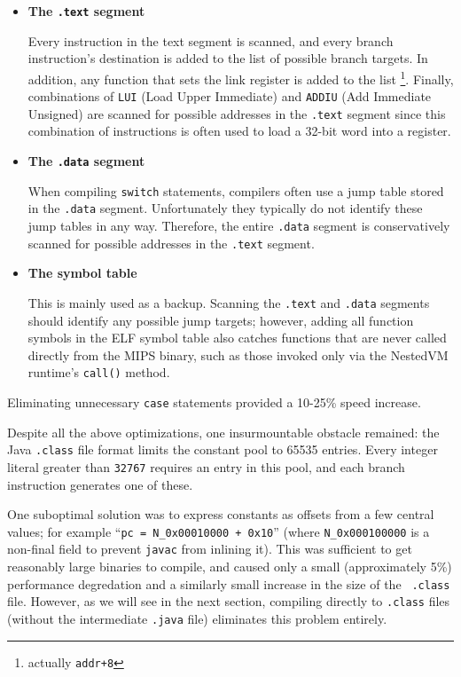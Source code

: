 \documentclass{acmconf}
\begin{document}
\begin{itemize}

\item {\bf The {\tt .text} segment}

      Every instruction in the text segment is scanned, and every
      branch instruction's destination is added to the list of
      possible branch targets.  In addition, any function that sets
      the link register is added to the list \footnote{actually {\tt addr+8}}.
      Finally, combinations of {\tt LUI} (Load Upper Immediate) and
      {\tt ADDIU} (Add Immediate Unsigned) are scanned for possible
      addresses in the {\tt .text} segment since this combination of
      instructions is often used to load a 32-bit word into a
      register.

\item {\bf The {\tt .data} segment}

      When compiling {\tt switch} statements, compilers often use a
      jump table stored in the {\tt .data} segment.  Unfortunately
      they typically do not identify these jump tables in any way.
      Therefore, the entire {\tt .data} segment is conservatively
      scanned for possible addresses in the {\tt .text} segment.
      
\item {\bf The symbol table}

      This is mainly used as a backup.  Scanning the {\tt .text} and
      {\tt .data} segments should identify any possible jump targets;
      however, adding all function symbols in the ELF symbol table
      also catches functions that are never called directly from the
      MIPS binary, such as those invoked only via the NestedVM
      runtime's {\tt call()} method.

\end{itemize}

Eliminating unnecessary {\tt case} statements provided a 10-25\% speed
increase.

Despite all the above optimizations, one insurmountable obstacle
remained: the Java {\tt .class} file format limits the constant pool
to 65535 entries.  Every integer literal greater than {\tt 32767}
requires an entry in this pool, and each branch instruction generates
one of these.

One suboptimal solution was to express constants as offsets from a few
central values; for example ``{\tt pc~=~N\_0x00010000~+~0x10}'' (where
{\tt N\_0x000100000} is a non-final field to prevent {\tt javac} from
inlining it).  This was sufficient to get reasonably large binaries to
compile, and caused only a small (approximately 5\%) performance
degredation and a similarly small increase in the size of the {\tt
.class} file.  However, as we will see in the next section, compiling
directly to {\tt .class} files (without the intermediate {\tt .java}
file) eliminates this problem entirely.
\end{document}
